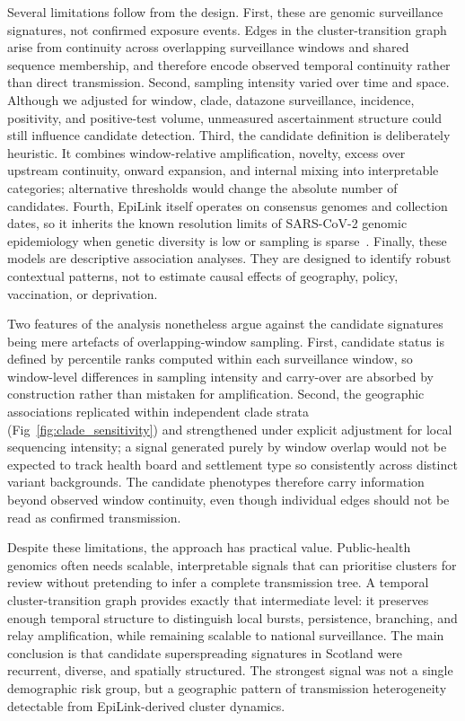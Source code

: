\documentclass[10pt,letterpaper]{article}
\begin{document}
Several limitations follow from the design. First, these are genomic surveillance signatures, not confirmed exposure events. Edges in the cluster-transition graph arise from continuity across overlapping surveillance windows and shared sequence membership, and therefore encode observed temporal continuity rather than direct transmission. Second, sampling intensity varied over time and space. Although we adjusted for window, clade, datazone surveillance, incidence, positivity, and positive-test volume, unmeasured ascertainment structure could still influence candidate detection. Third, the candidate definition is deliberately heuristic. It combines window-relative amplification, novelty, excess over upstream continuity, onward expansion, and internal mixing into interpretable categories; alternative thresholds would change the absolute number of candidates. Fourth, EpiLink itself operates on consensus genomes and collection dates, so it inherits the known resolution limits of SARS-CoV-2 genomic epidemiology when genetic diversity is low or sampling is sparse~\cite{Valesano2021,Bendall2022,ArthurEpiLink2026}. Finally, these models are descriptive association analyses. They are designed to identify robust contextual patterns, not to estimate causal effects of geography, policy, vaccination, or deprivation.

Two features of the analysis nonetheless argue against the candidate signatures being mere artefacts of overlapping-window sampling. First, candidate status is defined by percentile ranks computed within each surveillance window, so window-level differences in sampling intensity and carry-over are absorbed by construction rather than mistaken for amplification. Second, the geographic associations replicated within independent clade strata (Fig~\ref{fig:clade_sensitivity}) and strengthened under explicit adjustment for local sequencing intensity; a signal generated purely by window overlap would not be expected to track health board and settlement type so consistently across distinct variant backgrounds. The candidate phenotypes therefore carry information beyond observed window continuity, even though individual edges should not be read as confirmed transmission.

Despite these limitations, the approach has practical value. Public-health genomics often needs scalable, interpretable signals that can prioritise clusters for review without pretending to infer a complete transmission tree. A temporal cluster-transition graph provides exactly that intermediate level: it preserves enough temporal structure to distinguish local bursts, persistence, branching, and relay amplification, while remaining scalable to national surveillance. The main conclusion is that candidate superspreading signatures in Scotland were recurrent, diverse, and spatially structured. The strongest signal was not a single demographic risk group, but a geographic pattern of transmission heterogeneity detectable from EpiLink-derived cluster dynamics.
\end{document}
